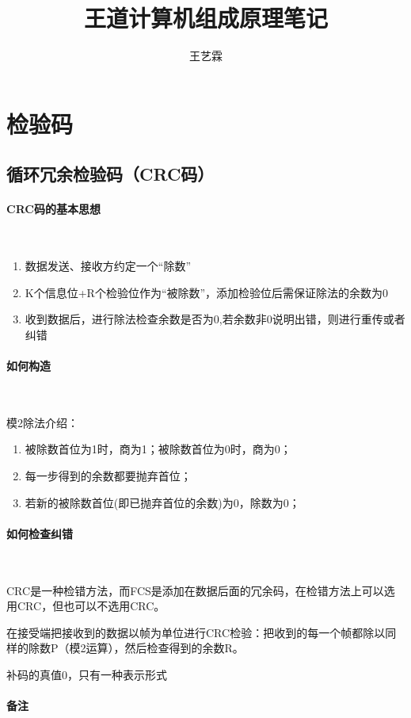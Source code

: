 \documentclass[12pt]{ctexart}
\begin{document}
    \title{王道计算机组成原理笔记}
    \author{王艺霖}
    \maketitle

\newpage

\section{检验码}
\subsection{循环冗余检验码（CRC码）}
\paragraph{CRC码的基本思想}~{}
\begin{enumerate}
    \item 数据发送、接收方约定一个“除数”
    \item K个信息位+R个检验位作为“被除数”，添加检验位后需保证除法的余数为0
    \item 收到数据后，进行除法检查余数是否为0,若余数非0说明出错，则进行重传或者纠错
\end{enumerate}


\paragraph{如何构造}~{}

模2除法介绍：
\begin{enumerate}
    \item 被除数首位为1时，商为1；被除数首位为0时，商为0；
    \item 每一步得到的余数都要抛弃首位；
    \item 若新的被除数首位(即已抛弃首位的余数)为0，除数为0；
\end{enumerate}


\paragraph{如何检查纠错}~{}

CRC是一种检错方法，而FCS是添加在数据后面的冗余码，在检错方法上可以选用CRC，但也可以不选用CRC。

在接受端把接收到的数据以帧为单位进行CRC检验：把收到的每一个帧都除以同样的除数P（模2运算），然后检查得到的余数R。


补码的真值0，只有一种表示形式
\paragraph{备注}~{}
\end{document}
